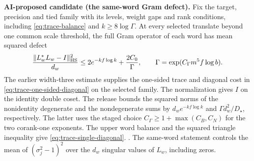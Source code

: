 \noindent\leavevmode{}%
\textbf{AI-proposed candidate (the same-word Gram defect).}
Fix the target, precision and tied family with its levels, weight
gaps and rank conditions, including \eqref{eq:trace-balance} and
\(k\ge8\log\Gamma\). At every selected translate beyond one common
scale threshold, the full Gram operator of each word has mean
squared defect
\begin{equation}
 \label{eq:trace-single-diagonal}
 \frac{\|L_w^*L_w-I\|_{\rm HS}^2}{d_w}
 \le 2e^{-kf\log k}+\frac{2C_0}{\Gamma},
 \qquad \Gamma=\exp(C_\Gamma m^5 f\log b).
\end{equation}
{The earlier width-three estimate supplies the one-sided trace and
diagonal cost in \eqref{eq:trace-one-sided-diagonal} on the selected family.}
The normalization gives \(I\) on the identity double coset. The
release bounds the squared norms of the nonidentity degenerate
and the nondegenerate sums by \(d_we^{-kf\log k}\) and
\(\Gamma d_w^2/D_\star\), respectively. The latter uses the staged
choice \(C_\Gamma\ge1+\max(C_B,C_N)\) for the two corank-one
exponents. The upper word balance and the squared triangle inequality
give \eqref{eq:trace-single-diagonal}.
.
The same-word statement controls the mean of \((\sigma_j^2-1)^2\)
over the \(d_w\) singular values of \(L_w\), including zeros.

